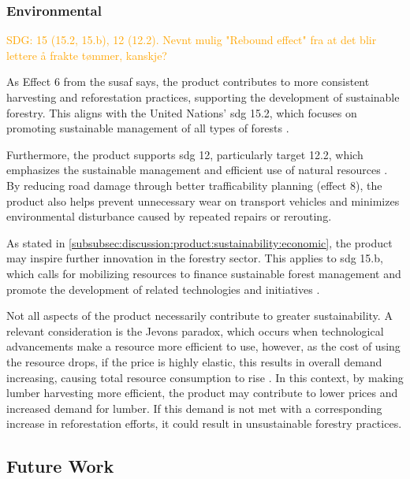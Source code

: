 \subsubsection{Environmental}

\textcolor{orange}{SDG: 15 (15.2, 15.b), 12 (12.2). Nevnt mulig "Rebound effect" fra at det blir lettere å frakte tømmer, kanskje?}

As Effect 6 from the \acrshort{susaf} says, the product contributes to more consistent harvesting and reforestation practices, supporting the development of sustainable forestry. This aligns with the United Nations' \acrshort{sdg} 15.2, which focuses on promoting sustainable management of all types of forests \cite{sdgsgoals}.

Furthermore, the product supports \acrshort{sdg} 12, particularly target 12.2, which emphasizes the sustainable management and efficient use of natural resources \cite{sdgsgoals}. By reducing road damage through better trafficability planning (effect 8), the product also helps prevent unnecessary wear on transport vehicles and minimizes environmental disturbance caused by repeated repairs or rerouting.

As stated in \autoref{subsubsec:discussion:product:sustainability:economic}, the product may inspire further innovation in the forestry sector. This applies to \acrshort{sdg} 15.b, which calls for mobilizing resources to finance sustainable forest management and promote the development of related technologies and initiatives \cite{sdgsgoals}.


Not all aspects of the product necessarily contribute to greater sustainability. A relevant consideration is the Jevons paradox, which  occurs when technological advancements make a resource more efficient to use, however, as the cost of using the resource drops, if the price is highly elastic, this results in overall demand increasing, causing total resource consumption to rise \cite{jevonsparadoxwiki}. In this context, by making lumber harvesting more efficient, the product may contribute to lower prices and increased demand for lumber. If this demand is not met with a corresponding increase in reforestation efforts, it could result in unsustainable forestry practices.

\subsection{Future Work}


